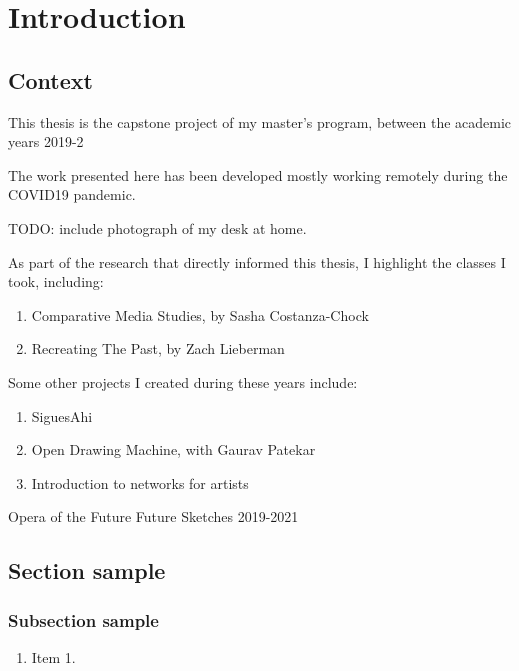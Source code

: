 \chapter{Introduction}

\section{Context}

This thesis is the capstone project of my master's program, between the academic years 2019-2

The work presented here has been developed mostly working remotely during the COVID19 pandemic.

TODO: include photograph of my desk at home.

As part of the research that directly informed this thesis, I highlight the classes I took,
including:

\begin{enumerate}
        \item Comparative Media Studies, by Sasha Costanza-Chock
        \item Recreating The Past, by Zach Lieberman
\end{enumerate}

Some other projects I created during these years include:

\begin{enumerate}
        \item SiguesAhi
        \item Open Drawing Machine, with Gaurav Patekar
        \item Introduction to networks for artists
\end{enumerate}


Opera of the Future
Future Sketches
2019-2021

\section{Section sample}\label{ch1:sec}


\subsection{Subsection sample}

\begin{enumerate}
  \item Item 1.
\end{enumerate}
